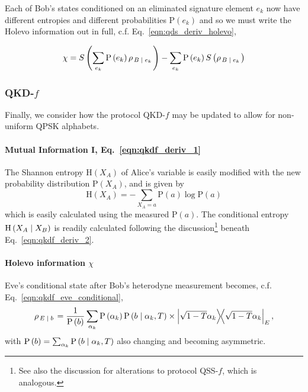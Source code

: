 Each of Bob's states conditioned on an eliminated signature element $e_k$ now have different entropies and different probabilities $\text{P}\left(e_k\right)$ and so we must write the Holevo information out in full, c.f. Eq.~\ref{eqn:qds_deriv_holevo},

\begin{equation}
\chi = S\left(\sum_{e_k} \text{P}\left(e_k\right) \rho_{\left.B\; \middle| \; e_k\right.}\right) - \sum_{e_k} \text{P}\left(e_k\right) S\left(\rho_{\left.B\; \middle| \; e_k\right.}\right)
\end{equation}

\subsubsection{QKD-$f$}



Finally, we consider how the protocol QKD-$f$ may be updated to allow for non-uniform QPSK alphabets.

\paragraph{Mutual Information I, Eq.~\ref{eqn:qkdf_deriv_1}}

The Shannon entropy $\text{H}\left(X_A\right)$ of Alice's variable is easily modified with the new probability distribution $\text{P}\left(X_A\right)$, and is given by
\begin{equation}
\text{H}\left(X_A\right) = - \sum_{X_A=a} \text{P}\left(a\right) \log \text{P}\left(a\right)
\end{equation}
which is easily calculated using the measured $\text{P}\left(a\right)$. The conditional entropy $\text{H}\left(X_A \; \middle| \; X_B\right)$ is readily calculated following the discussion\footnote{See also the discussion for alterations to protocol QSS-$f$, which is analogous.} beneath Eq.~\ref{eqn:qkdf_deriv_2}.

\paragraph{Holevo information $\chi$}
Eve's conditional state after Bob's heterodyne measurement becomes, c.f. Eq.~\ref{eqn:qkdf_eve_conditional},
\begin{equation}\label{eqn:qkdf_eve_conditional_modified}
\rho_{\left. E \given b\right.} = \frac{1}{\text{P}\left(b\right)} \sum_{\alpha_k} \text{P}\left(\alpha_k\right) \text{P}\left(b \given \alpha_k, T\right) \times \dyad{\sqrt{1-T}\alpha_k}_E,
\end{equation}
with $\text{P}\left(b\right) = \sum_{\alpha_k} \text{P}\left(b \; \middle| \; \alpha_k, T\right)$ also changing and becoming asymmetric. 

